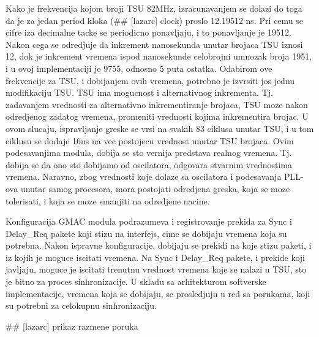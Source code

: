 \documentclass[a4paper,12pt, master]{etf}
\begin{document}
    Kako je frekvencija kojom broji TSU 82MHz, izracunavanjem se dolazi do toga da je za jedan period kloka 
    (\#\# [lazarc] clock) proslo 12.19512 ns. Pri cemu se cifre iza decimalne tacke se periodicno ponavljaju, 
    i to ponavljanje je 19512. Nakon cega se odredjuje da inkrement nanosekunda unutar brojaca TSU iznosi 12, 
    dok je inkrement vremena ispod nanosekunde celobrojni umnozak broja 1951, i u ovoj implementaciji je 9755,
     odnosno 5 puta ostatka. Odabirom ove frekvencije za TSU, i dobijanjem ovih vremena, potrebno je izvrsiti
     jos jednu modifikaciju TSU. TSU ima mogucnost i alternativnog inkrementa. Tj. zadavanjem vrednosti za 
     alternativno inkrementiranje brojaca, TSU moze nakon odredjenog zadatog vremena, promeniti vrednosti 
     kojima inkrementira brojac. U ovom slucaju, ispravljanje greske se vrsi na svakih 83 ciklusa unutar TSU, 
     i u tom ciklusu se dodaje 16ns na vec postojecu vrednost unutar TSU brojaca. Ovim podesavanjima modula, 
     dobija se sto vernija predstava realnog vremena. Tj. dobija se da ono sto dobijamo od oscilatora, 
     odgovara stvarnim vrednostima vremena. Naravno, zbog vrednosti koje dolaze sa oscilatora i podesavanja 
     PLL-ova unutar samog procesora, mora postojati odredjena greska, koja se moze tolerisati, i koja se moze 
     smanjiti na odredjene nacine.

    Konfiguracija GMAC modula podrazumeva i registrovanje prekida za Sync i Delay\_Req pakete koji stizu na 
    interfejs, cime se dobijaju vremena koja su potrebna. Nakon ispravne konfiguracije, dobijaju se prekidi 
    na koje stizu paketi, i iz kojih je moguce iscitati vremena. Na Sync i Delay\_Req pakete, i prekide koji 
    javljaju, moguce je iscitati trenutnu vrednost vremena koje se nalazi u TSU, sto je bitno za proces 
    sinhronizacije. U skladu sa arhitekturom softverske implementacije, vremena koja se dobijaju, se 
    prosledjuju u red sa porukama, koji su potrebni za celokupnu sinhronizaciju.

    \#\# [lazarc] prikaz razmene poruka 
\end{document}
